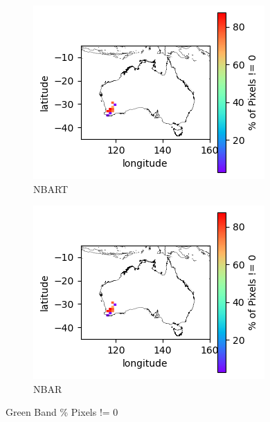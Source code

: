 \documentclass[a4paper]{article}
\begin{document}
      \begin{figure}[h!]
        \centering
          \begin{subfigure}[l]{.4\linewidth}
            \hspace{-32mm}
            \includegraphics[scale=0.9]{plots/nbart/nbart_green-PercentDifferent.png}
            \caption{NBART}
          \end{subfigure}
%
          \begin{subfigure}[r]{.4\linewidth}
            \includegraphics[scale=0.9]{plots/nbar/nbar_green-PercentDifferent.png}
            \caption{NBAR}
          \end{subfigure}
        \caption{Green Band \% Pixels != 0}\label{figure:25}
      \end{figure}
\end{document}
